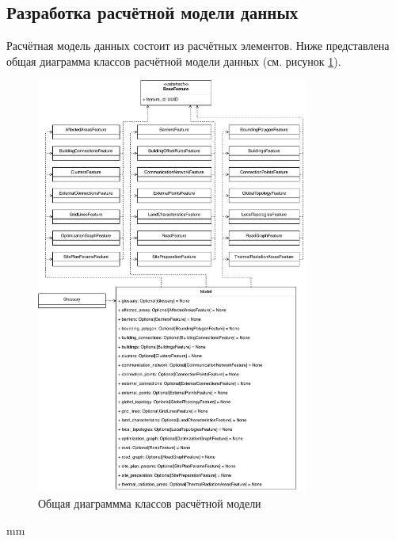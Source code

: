 \subsection{\large{Разработка расчётной модели данных}}

Расчётная модель данных состоит из расчётных элементов. Ниже представлена общая диаграмма классов расчётной модели данных
(см. рисунок \ref{pic:implementation__model-classes}).

\begin{figure}[H]
	\includegraphics[width=0.8\textwidth]{implementation/pictures/model/classes}
	\caption{Общая диаграммма классов расчётной модели}
	\label{pic:implementation__model-classes}
\end{figure}
 mm

